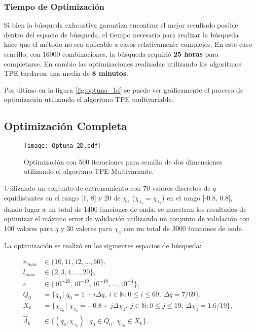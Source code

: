 \subsubsection*{Tiempo de Optimización}

Si bien la búsqueda exhaustiva garantiza encontrar el mejor resultado posible dentro del espacio de búsqueda, el tiempo necesario para realizar la búsqueda hace que el método no sea aplicable a casos relativamente complejos. En este caso sencillo, con 16000 combinaciones, la búsqueda requirió \textbf{25 horas} para completarse. En cambio las optimizaciones realizadas utilizando los algoritmos TPE tardaron una media de \textbf{8 minutos}.

Por último en la figura \ref{fig:optuna_1d} se puede ver gráficamente el proceso de optimización utilizando el algoritmo TPE multivariable.

\subsection{Optimización Completa}

\begin{figure}[p!]
\centering
\texttt{[image: Optuna\_2D.pdf]}
\caption{Optimización con 500 iteraciones para semilla de dos dimensiones utilizando el algoritmo TPE Multivariante.}
\label{fig:optuna_2d}
\end{figure}

Utilizando un conjunto de entrenamiento con 70 valores discretos de $q$ equidistantes en el rango [1, 8] y 20 de $\chi_z$ ($\chi_{z_1} = \chi_{z_2}$) en el rango [-0.8, 0.8], dando lugar a un total de 1400 funciones de onda, se muestran los resultados de optimizar el máximo error de validación utilizando un conjunto de validación con 100 valores para $q$ y 30 valores para $\chi_z$ con un total de 3000 funciones de onda.

La optimización se realizó en los siguientes espacios de búsqueda:
 
\begin{align*}
n_{max} &\in \{10, 11, 12, ..., 60\},\\
l_{max} &\in \{2, 3, 4, ..., 20 \},\\
\varepsilon &\in \{ 10^{-20}, 10^{-19}, 10^{-18}, ..., 10^{-4}\},\\
Q_0 &= \{ q_0 \ | \ q_0 = 1 + i \Delta q, \ i\in \mathbb{N} : 0 \le i \le 69, \ \Delta q = 7/69 \},\\
X_0 &= \{\chi_{z_0} \ | \ \chi_{z_0} = -0.8 + j \Delta \chi_z, \ j\in \mathbb{N} : 0 \le j \le 19, \ \Delta \chi_z = 1.6/19 \}, \\
\hat{\Lambda}_0 &\in \{ (q_0, \chi_{z_0}) \ | \ q_0 \in Q_0,\ \chi_{z_0} \in X_0 \}.
\end{align*}


